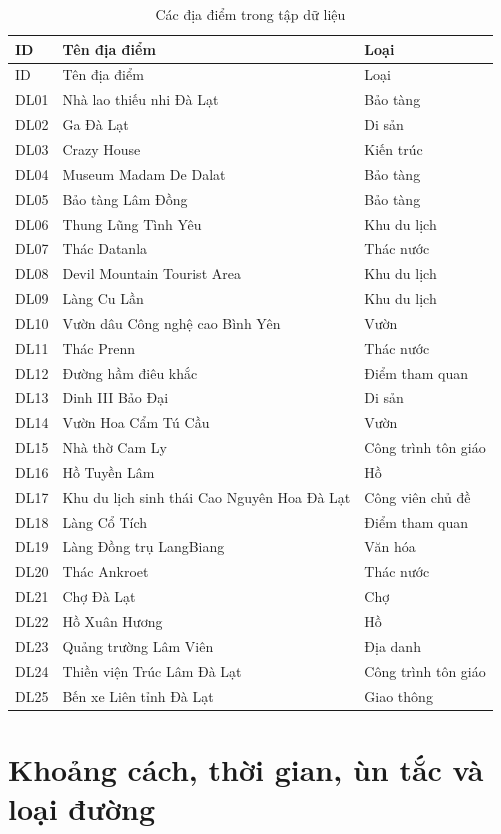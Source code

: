 \begin{longtable}{p{1.2cm}p{7.0cm}p{4.6cm}}
\caption{Các địa điểm trong tập dữ liệu}\label{tab:locations}\\
\toprule
ID & Tên địa điểm & Loại \\
\midrule
\endfirsthead
\toprule
ID & Tên địa điểm & Loại \\
\midrule
\endhead
DL01 & Nhà lao thiếu nhi Đà Lạt & Bảo tàng \\
DL02 & Ga Đà Lạt & Di sản \\
DL03 & Crazy House & Kiến trúc \\
DL04 & Museum Madam De Dalat & Bảo tàng \\
DL05 & Bảo tàng Lâm Đồng & Bảo tàng \\
DL06 & Thung Lũng Tình Yêu & Khu du lịch \\
DL07 & Thác Datanla & Thác nước \\
DL08 & Devil Mountain Tourist Area & Khu du lịch \\
DL09 & Làng Cu Lần & Khu du lịch \\
DL10 & Vườn dâu Công nghệ cao Bình Yên & Vườn \\
DL11 & Thác Prenn & Thác nước \\
DL12 & Đường hầm điêu khắc & Điểm tham quan \\
DL13 & Dinh III Bảo Đại & Di sản \\
DL14 & Vườn Hoa Cẩm Tú Cầu & Vườn \\
DL15 & Nhà thờ Cam Ly & Công trình tôn giáo \\
DL16 & Hồ Tuyền Lâm & Hồ \\
DL17 & Khu du lịch sinh thái Cao Nguyên Hoa Đà Lạt & Công viên chủ đề \\
DL18 & Làng Cổ Tích & Điểm tham quan \\
DL19 & Làng Đồng trụ LangBiang & Văn hóa \\
DL20 & Thác Ankroet & Thác nước \\
DL21 & Chợ Đà Lạt & Chợ \\
DL22 & Hồ Xuân Hương & Hồ \\
DL23 & Quảng trường Lâm Viên & Địa danh \\
DL24 & Thiền viện Trúc Lâm Đà Lạt & Công trình tôn giáo \\
DL25 & Bến xe Liên tỉnh Đà Lạt & Giao thông \\
\bottomrule
\end{longtable}

\section{Khoảng cách, thời gian, ùn tắc và loại đường}

